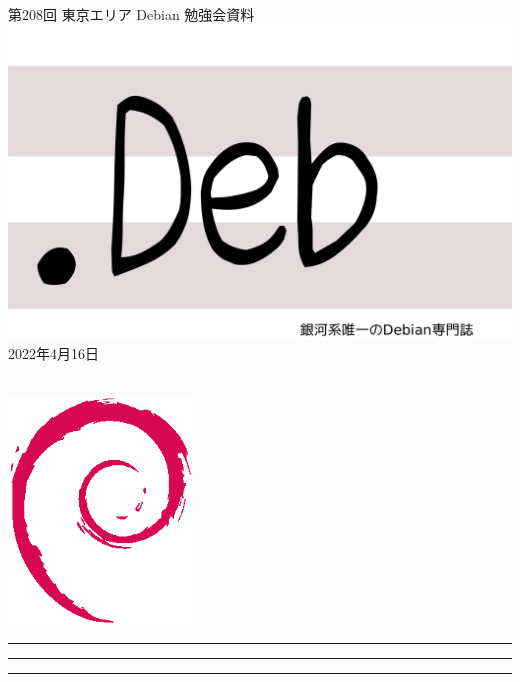 \documentclass[mingoth,a4paper]{jsarticle}
\newcommand{\debmtgyear}{2022}
\newcommand{\debmtgmonth}{4}
\newcommand{\debmtgdate}{16}
\newcommand{\debmtgnumber}{208}
\begin{document}
\begin{titlepage}
\thispagestyle{empty}

\vspace*{-2cm}
第\debmtgnumber{}回 東京エリア Debian 勉強会資料\\
\hspace*{-2cm}
\includegraphics{image-assets/dotdeb.pdf}\\
\hfill{}\debmtgyear{}年\debmtgmonth{}月\debmtgdate{}日

\\

\vspace*{-2cm}
\hfill{}\includegraphics[height=6cm]{image-assets/openlogo-nd.eps}
\end{titlepage}

\newpage

\begin{minipage}[b]{0.2\hsize}
 \colorbox{titleback}{}
\end{minipage}
\begin{minipage}[b]{0.8\hsize}
\hrule
\vspace{2mm}
\hrule
\begin{multicols}{2}
\tableofcontents
\end{multicols}
\vspace{2mm}
\hrule
\end{minipage}
\end{document}
